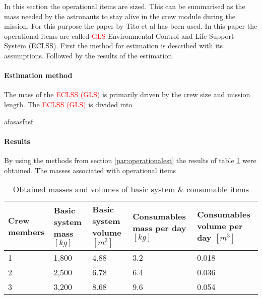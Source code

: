 In this section the operational items are sized. This can be summarised as the mass needed by the astronauts to stay alive in the crew module during the mission. For this purpose the paper by Tito et al \cite{tito2013} has been used. In this paper the operational items are called \textcolor{red}{GLS} Environmental Control and Life Support System (ECLSS). First the method for estimation is described with its assumptions. Followed by the results of the estimation.

\paragraph{Estimation method}
The mass of the \textcolor{red}{ECLSS (GLS)} is primarily driven by the crew size and mission length. The \textcolor{red}{ECLSS (GLS)} is divided into 





afasasfasf
\paragraph{Results}
By using the methods from section \ref{par:operationalest} the results of table \ref{tab:operationalest} were obtained.
The masses associated with operational items 
\begin{table}[h]
	\centering
	\caption{Obtained masses and volumes of basic system \& consumable items}
	\begin{tabular}{|p{2cm}|p{2cm}|p{2cm}|p{2.5cm}|p{2.5cm}|}
		\hline
		\textbf{Crew members} & \textbf{Basic system mass $[kg]$} & \textbf{Basic system volume $[m^{3}]$} & \textbf{Consumables mass per day $[kg]$} & \textbf{Consumables volume per day $[m^{3}]$} \\ \hline \hline
		1 & 1,800 & 4.88 & 3.2 & 0.018 \\
		2 & 2,500 & 6.78 & 6.4 & 0.036 \\
		3 & 3,200 & 8.68 & 9.6 & 0.054 \\
		\hline
	\end{tabular}
	\label{tab:operationalest}
\end{table}